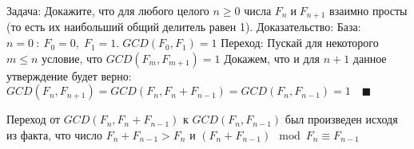$\textbf{Задача:}$
Докажите, что для любого целого $n \geq 0$ числа $F_n \; и \; F_{n + 1}$ взаимно просты (то есть их наибольший общий
делитель равен 1).
$\textbf{Доказательство:}$
$\textbf{База:}$
$n = 0 \: \colon \: F_0 = 0, \; F_1 = 1. \; GCD(F_0, F_1) = 1$
$\textbf{Переход:}$
Пускай для некоторого $m \leq n$ условие, что $GCD(F_m, F_{m + 1}) = 1$
Докажем, что и для $n + 1$ данное утверждение будет верно:
$GCD(F_n, F_{n + 1}) = GCD(F_n, F_n + F_{n - 1}) = GCD(F_n, F_{n - 1}) = 1 \quad \blacksquare$

Переход от $GCD(F_n, F_n + F_{n - 1})$ к $GCD(F_n, F_{n - 1})$ был произведен исходя из факта, что число
$F_n + F_{n - 1} > F_n$ и $(F_n + F_{n - 1}) \mod F_n \equiv F_{n - 1}$